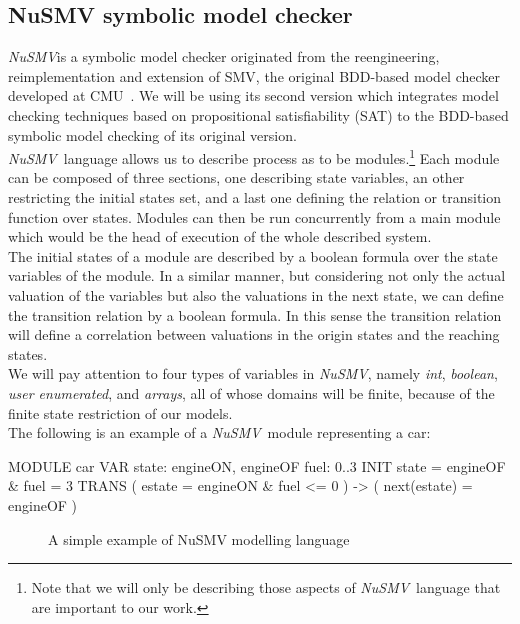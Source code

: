 \documentclass[12pt]{article}
\newcommand{\nusmv}{\mbox{\textit{NuSMV}}}
\begin{document}
\subsection{NuSMV symbolic model checker}\label{nusmv}
\nusmv is a symbolic model checker originated from the reengineering,
reimplementation and extension of SMV, the original BDD-based model checker
developed at CMU~\cite{cimatti}. We will be using its second version which
integrates model checking techniques based on propositional satisfiability
(SAT) to the BDD-based symbolic model checking of its original version.\\
\nusmv ~language allows us to describe process as to be modules.\footnote{Note
that we will only be describing those aspects of \nusmv ~language that are
important to our work.} Each module
can be composed of three sections, one describing state variables, an other
restricting the initial states set, and a last one defining the relation or
transition function over states. Modules can then be run
concurrently from a main module which would be the head of execution of the whole
described system.\\
The initial states of a module are described by a boolean formula over the
state variables of the module. In a similar manner, but considering not
only the actual valuation of the variables but also the valuations in
the next state, we can define the transition relation by a boolean formula.
In this sense the transition relation will define a correlation between
valuations in the origin states and the reaching states.\\
We will pay attention to four types of variables in \nusmv, namely \textit{int}, \textit{boolean}, \textit{user enumerated}, and \textit{arrays}, all of whose domains will be
finite, because of the finite state restriction of our models.\\
The following is an example of a \nusmv ~module representing a car:
\begin{verbbox}
MODULE car
    VAR
        state: {engineON, engineOF}
        fuel: 0..3
    INIT
        state = engineOF & fuel = 3
    TRANS
        ( estate = engineON & fuel <= 0 ) 
        -> 
        ( next(estate) = engineOF )
\end{verbbox}
\begin{figure}[h]
\begin{framed}
    \centering
    \theverbbox
\end{framed}
    \caption{A simple example of NuSMV modelling language}
    \label{nusmvexample}
\end{figure}
\end{document}
